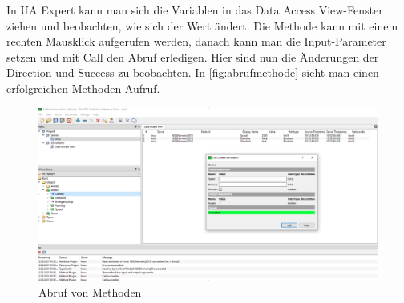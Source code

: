 In UA Expert kann man sich die Variablen in das Data Access View-Fenster ziehen und beobachten, wie sich der Wert ändert. 
Die Methode kann mit einem rechten Mausklick aufgerufen werden, danach kann man die Input-Parameter setzen und mit Call den Abruf erledigen. Hier sind nun die Änderungen der Direction und Success zu beobachten. In \autoref{fig:abrufmethode} sieht man einen erfolgreichen Methoden-Aufruf.

\begin{figure}[H]
	\centering
	\includegraphics[width=1\linewidth]{abb/AbrufMethode}
	\caption{Abruf von Methoden}
	\label{fig:abrufmethode}
\end{figure}
\clearpage
